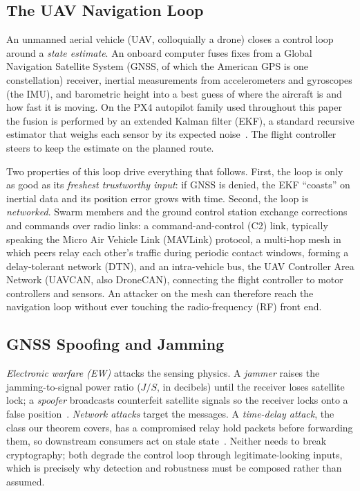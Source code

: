 \subsection{The UAV Navigation Loop}
An unmanned aerial vehicle (UAV, colloquially a drone) closes a control loop
around a \emph{state estimate}. An onboard computer fuses fixes from a Global
Navigation Satellite System (GNSS, of which the American GPS is one
constellation) receiver, inertial measurements from accelerometers and
gyroscopes (the IMU), and barometric height into a best guess of where the
aircraft is and how fast it is moving. On the PX4 autopilot family used
throughout this paper the fusion is performed by an extended Kalman filter
(EKF), a standard recursive estimator that weighs each sensor by its expected
noise~\cite{kong2024px4ekf}. The flight controller steers to keep the estimate
on the planned route.

Two properties of this loop drive everything that follows. First, the loop is
only as good as its \emph{freshest trustworthy input}: if GNSS is denied, the
EKF ``coasts'' on inertial data and its position error grows with time. Second,
the loop is \emph{networked}. Swarm members and the ground control station
exchange corrections and commands over radio links: a command-and-control (C2) link, typically
speaking the Micro Air Vehicle Link (MAVLink) protocol, a multi-hop mesh in which peers relay each other's traffic
during periodic contact windows, forming a delay-tolerant network (DTN), and an
intra-vehicle bus, the UAV Controller Area Network (UAVCAN, also DroneCAN),
connecting the flight controller to motor controllers and sensors. An attacker on the mesh can therefore reach the
navigation loop without ever touching the radio-frequency (RF) front end.

\subsection{GNSS Spoofing and Jamming}
\emph{Electronic warfare (EW)} attacks the sensing physics. A \emph{jammer}
raises the jamming-to-signal power ratio ($J/S$, in decibels) until the
receiver loses satellite lock; a \emph{spoofer}
broadcasts counterfeit satellite signals so the receiver locks onto a false
position~\cite{humphreys2008assessing,kerns2014capture}. \emph{Network attacks}
target the messages. A \emph{time-delay attack}, the class our theorem
covers, has a compromised relay hold packets before forwarding them, so
downstream consumers act on stale state~\cite{lou2019timedelay,datamut2026}.
Neither needs to break cryptography; both degrade the control loop through
legitimate-looking inputs, which is precisely why detection and robustness must
be composed rather than assumed.

